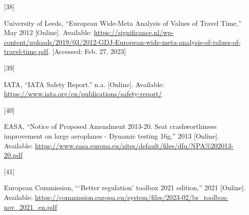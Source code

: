 \documentclass[
  11pt,
  a4paper,
]{book}
\newlength{\cslhangindent}
\newlength{\csllabelwidth}
\newlength{\cslentryspacingunit} %
\newenvironment{CSLReferences}[2] %
 {%
  \setlength{\parindent}{0pt}
  \ifodd #1
  \let\oldpar\par
  \def\par{\hangindent=\cslhangindent\oldpar}
  \fi
  \setlength{\parskip}{#2\cslentryspacingunit}
 }%
 {}
\newcommand{\CSLLeftMargin}[1]{\parbox[t]{\csllabelwidth}{#1}}
\newcommand{\CSLRightInline}[1]{\parbox[t]{\linewidth - \csllabelwidth}{#1}\break}
\begin{document}
\begin{CSLReferences}{0}{0}
\leavevmode{}%
\CSLLeftMargin{{[}38{]} }%
\CSLRightInline{University of Leeds, {``European {Wide-Meta Analysis} of
{Values} of {Travel Time},''} May 2012 {[}Online{]}. Available:
\url{https://significance.nl/wp-content/uploads/2019/03/2012-GDJ-European-wide-meta-analysis-of-values-of-travel-time.pdf}.
{[}Accessed: Feb. 27, 2023{]}}

\leavevmode{}%
\CSLLeftMargin{{[}39{]} }%
\CSLRightInline{IATA, {``{IATA Safety Report}.''} n.a. {[}Online{]}.
Available: \url{https://www.iata.org/en/publications/safety-report/}}

\leavevmode{}%
\CSLLeftMargin{{[}40{]} }%
\CSLRightInline{EASA, {``Notice of {Proposed Amendment} 2013-20. {Seat}
crashworthiness improvement on large aeroplanes - {Dynamic} testing
16g,''} 2013 {[}Online{]}. Available:
\url{https://www.easa.europa.eu/sites/default/files/dfu/NPA\%202013-20.pdf}}

\leavevmode{}%
\CSLLeftMargin{{[}41{]} }%
\CSLRightInline{European Commission, {``{`{Better} regulation'} toolbox
\textendash{{November}} 2021 edition,''} 2021 {[}Online{]}. Available:
\url{https://commission.europa.eu/system/files/2023-02/br_toolbox-nov_2021_en.pdf}}

\end{CSLReferences}


\backmatter
\end{document}
